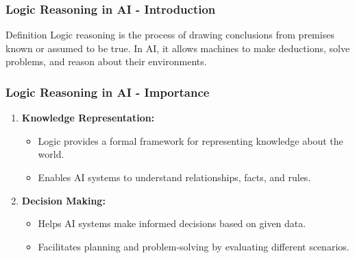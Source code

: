 \documentclass[aspectratio=169]{beamer}
\begin{document}
\begin{frame}[fragile]
    \frametitle{Logic Reasoning in AI - Introduction}
    \begin{block}{Definition}
        Logic reasoning is the process of drawing conclusions from premises known or assumed to be true. In AI, it allows machines to make deductions, solve problems, and reason about their environments.
    \end{block}
\end{frame}

\begin{frame}[fragile]
    \frametitle{Logic Reasoning in AI - Importance}
    \begin{enumerate}
        \item \textbf{Knowledge Representation:}
        \begin{itemize}
            \item Logic provides a formal framework for representing knowledge about the world.
            \item Enables AI systems to understand relationships, facts, and rules.
        \end{itemize}
        
        \item \textbf{Decision Making:}
        \begin{itemize}
            \item Helps AI systems make informed decisions based on given data.
            \item Facilitates planning and problem-solving by evaluating different scenarios.
        \end{itemize}
    \end{enumerate}
\end{frame}
\end{document}
